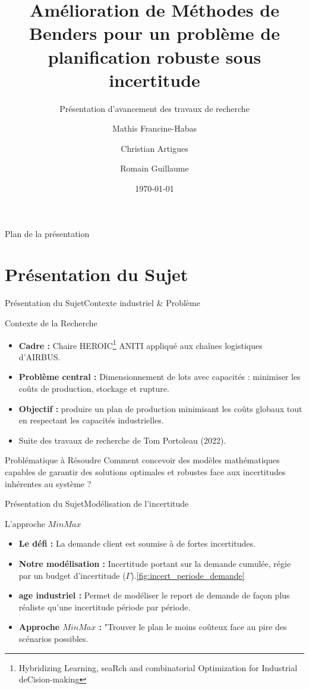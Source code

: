 \documentclass[10pt]{beamer}
\title[Avancée des Recherches]{Amélioration de Méthodes de Benders pour un
problème de planification robuste sous incertitude}
\subtitle{Présentation d'avancement des travaux de recherche}
\author[M. Francine-Habas]{
    Mathis Francine-Habas\inst{1, 2} \and 
    Christian Artigues\inst{1} \and 
    Romain Guillaume\inst{2}
}
\institute[UT3 - LAAS]{
    \inst{1} LAAS-CNRS, ENAC, Université de Toulouse\\
    \vspace{0.2cm}
    \inst{2} IRIT-CNRS, ANITI, Université Jean-Jaurès
}
\date{\today}
\begin{document}
\begin{frame}[plain]
    \titlepage
\end{frame}

\begin{frame}{Plan de la présentation}
    \tableofcontents[hideallsubsections]
\end{frame}

\section{Présentation du Sujet}

\begin{frame}{Présentation du Sujet}{Contexte industriel \& Problème}
    \begin{block}{Contexte de la Recherche}
        \begin{itemize}
        	\item \textbf{Cadre :} Chaire HEROIC\footnote{Hybridizing Learning, seaRch and combinatorial Optimization for Industrial deCision-making} ANITI appliqué aux chaînes logistiques d'AIRBUS.
        	\item \textbf{Problème central :} Dimensionnement de lots avec capacités : minimiser les coûts de production, stockage et rupture.
        	\item \textbf{Objectif :} produire un plan de production minimisant les coûts globaux tout en respectant les capacités industrielles.
            \item Suite des travaux de recherche de Tom Portoleau (2022).
        \end{itemize}
    \end{block}

    \begin{alertblock}{Problématique à Résoudre}
        Comment concevoir des modèles mathématiques capables de garantir des solutions optimales et robustes face aux incertitudes inhérentes au système ?
    \end{alertblock}
\end{frame}

\begin{frame}{Présentation du Sujet}{Modélisation de l'incertitude}
	\begin{block}{L'approche $MinMax$}
		\begin{itemize}
			\item \textbf{Le défi :} La demande client est soumise à de fortes incertitudes.
			\item \textbf{Notre modélisation :} Incertitude portant sur la demande cumulée, régie par un budget d'incertitude ($\Gamma$).\ref{fig:incert_periode_demande}
			\item \textbf{age industriel :} Permet de modéliser le report de demande de façon plus réaliste qu'une incertitude période par période.
			\item \textbf{Approche $MinMax$ :} "Trouver le plan le moins coûteux face au pire des scénarios possibles.
		\end{itemize}
	\end{block}
\end{frame}
\end{document}

